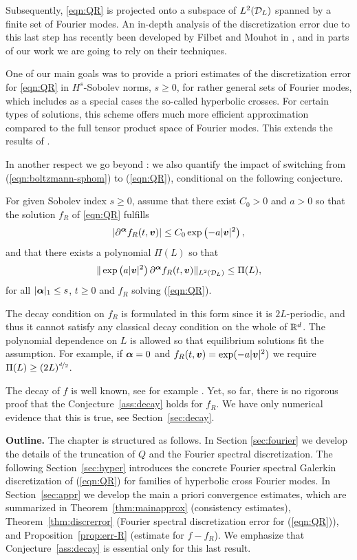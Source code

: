 Subsequently, \eqref{eqn:QR} is projected onto a subspace of $L^{2}(\mathcal{D}_{L})$ spanned by a
finite set of Fourier modes. An in-depth analysis of the discretization error due
to this last step has recently been developed by Filbet and Mouhot in \cite{Filbet11},
and in parts of our work we are going to rely on their techniques. 

One of our main goals was to provide a priori estimates of the discretization error for \eqref{eqn:QR} in
$H^{s}$-Sobolev norms, $s\geq 0$, for rather general sets of Fourier modes, which includes as a special cases
the so-called hyperbolic crosses. For certain types of solutions, this scheme offers much more efficient
approximation compared to the full tensor product space of Fourier modes. This extends the results of
\cite{Filbet11}. 

In another respect we go beyond \cite{Filbet11}: we also quantify the impact of
switching from (\ref{eqn:boltzmann-sphom}) to (\ref{eqn:QR}), conditional
on the following conjecture.
\begin{conjecture} \label{ass:decay}
  For given Sobolev index $s\geq 0$, assume that there exist $C_0>0$ and $a>0$ so that the solution
  $f_R$ of \eqref{eqn:QR} fulfills
  $$
  |\partial^{\bm\alpha} f_R(t,{\bm v})| \le C_0\exp\left(-a|{\bm v}|^2\right),
  $$
  and that there exists a polynomial $\Pi(L)$ so that
  $$
  \| \exp\left(a|{\bm v}|^2\right) \partial^{\bm\alpha} f_R(t,{\bm v}) \|_{L^2(\mathcal{D}_L)} \leq
  \Pi(L),
  $$
  for all $|{\bm\alpha}|_1\leq s$, $t\geq0$ and $f_{R}$ solving (\ref{eqn:QR}).
\end{conjecture}
\begin{remark}
  The decay condition on $f_R$ is formulated in this form since it is
  $2L$-periodic, and thus it cannot satisfy any classical decay condition on the
  whole of $\mathbb{R}^d$. The polynomial dependence on $L$ is allowed so that 
  equilibrium solutions fit the assumption. For example, if ${\bm\alpha}=0$ and 
  $f_R(t,{\bm v})=\exp(-a|{\bm v}|^2)$ we require $\Pi(L) \geq (2L)^{\nicefrac{d}{2}}$.
  
  The decay of $f$ is well known, see for example \cite{Bobylev97}.  Yet, so far,
  there is no rigorous proof that the Conjecture~\ref{ass:decay} holds for
  $f_R$. We have only numerical evidence that this is true, see
  Section~\ref{sec:decay}.
\end{remark}

\textbf{Outline.} The chapter is structured as follows. In Section \ref{sec:fourier}
we develop the details of the truncation of $Q$ and the Fourier spectral discretization.
The following Section~\ref{sec:hyper} introduces the concrete Fourier spectral 
Galerkin discretization of (\ref{eqn:QR}) for families of hyperbolic cross Fourier
modes. In Section~\ref{sec:appr} we develop the main a priori convergence
estimates, which are summarized in Theorem~\ref{thm:mainapprox} (consistency
estimates), Theorem~\ref{thm:discrerror} (Fourier spectral discretization error
for (\ref{eqn:QR})), and Proposition~\ref{prop:err-R} (estimate for $f-f_{R}$). 
We emphasize that Conjecture~\ref{ass:decay} is essential only for this last result.

